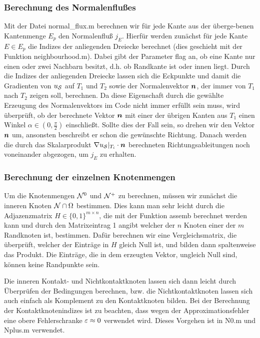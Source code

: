 \subsubsection{Berechnung des Normalenflußes}

Mit der Datei {\ttfamily normal_flux.m} berechnen wir für jede Kante aus der überge-benen Kantenmenge $E_p$ den Normalenfluß $j_E$. Hierfür werden zunächst für jede Kante $E \in E_p$ die Indizes der anliegenden Dreiecke berechnet (dies geschieht mit der Funktion {\ttfamily neighbourhood.m}). Dabei gibt der Parameter {\ttfamily flag} an, ob eine Kante nur einen oder zwei Nachbarn besitzt, d.h. ob Randkante ist oder innen liegt. Durch die Indizes der anliegenden Dreiecke lassen sich die Eckpunkte und damit die Gradienten von $u_{\mathcal S}$ auf $T_1$ und $T_2$ sowie der Normalenvektor $\boldsymbol n$, der immer von $T_1$ nach $T_2$ zeigen soll, berechnen. Da diese Eigenschaft durch die gewählte Erzeugung des Normalenvektors im Code  nicht immer erfüllt sein muss, wird überprüft, ob der berechnete Vektor $\boldsymbol n$ mit einer der übrigen Kanten aus $T_1$ einen Winkel $\alpha \in (0,\frac \pi2)$ einschließt. Sollte dies der Fall sein, so drehen wir den Vektor $\boldsymbol n$ um, ansonsten beschreibt er schon die gewünschte Richtung. Danach werden die durch das Skalarprodukt $\nabla u_{\mathcal S}|_{T_i} \cdot \boldsymbol n$ berechneten Richtungsableitungen noch voneinander abgezogen, um $j_E$ zu erhalten.



\subsubsection{Berechnung der einzelnen Knotenmengen}

Um die Knotenmengen $\mathcal N^0$ und $\mathcal N^+$ zu berechnen, müssen wir zunächst die inneren Knoten $\mathcal N\cap \Omega$ bestimmen. Dies kann man sehr leicht durch die Adjazenzmatrix $H \in \{0,1\}^{m\times n}$, die mit der Funktion {\ttfamily assemb} berechnet werden kann und durch den Matrixeintrag 1 angibt welcher der $n$ Knoten einer der $m$ Randknoten ist, bestimmen. Dafür berechnen wir eine Vergleichsmatrix, die überprüft, welcher der Einträge in $H$ gleich Null ist, und bilden dann spaltenweise das Produkt. Die Einträge, die in dem erzeugten Vektor, ungleich Null sind, können keine Randpunkte sein.

Die inneren Kontakt- und Nichtkontaktknoten lassen sich dann leicht durch Überprüfen der Bedingungen berechnen, bzw. die Nichtkontaktknoten lassen sich auch einfach als Komplement zu den Kontaktknoten bilden. Bei der Berechnung der Kontaktknotenindizes ist zu beachten, dass wegen der Approximationsfehler eine obere Fehlerschranke $\varepsilon \approx 0$ verwendet wird. Dieses Vorgehen ist in {\ttfamily N0.m} und {\ttfamily Nplus.m} verwendet.

